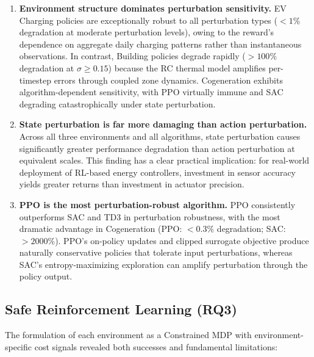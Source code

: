 \begin{enumerate}
    \item \textbf{Environment structure dominates perturbation sensitivity.} EV Charging policies are exceptionally robust to all perturbation types ($<1\%$ degradation at moderate perturbation levels), owing to the reward's dependence on aggregate daily charging patterns rather than instantaneous observations. In contrast, Building policies degrade rapidly ($>100\%$ degradation at $\sigma \geq 0.15$) because the RC thermal model amplifies per-timestep errors through coupled zone dynamics. Cogeneration exhibits algorithm-dependent sensitivity, with PPO virtually immune and SAC degrading catastrophically under state perturbation.

    \item \textbf{State perturbation is far more damaging than action perturbation.} Across all three environments and all algorithms, state perturbation causes significantly greater performance degradation than action perturbation at equivalent scales. This finding has a clear practical implication: for real-world deployment of RL-based energy controllers, investment in sensor accuracy yields greater returns than investment in actuator precision.

    \item \textbf{PPO is the most perturbation-robust algorithm.} PPO consistently outperforms SAC and TD3 in perturbation robustness, with the most dramatic advantage in Cogeneration (PPO: $<0.3\%$ degradation; SAC: $>2000\%$). PPO's on-policy updates and clipped surrogate objective produce naturally conservative policies that tolerate input perturbations, whereas SAC's entropy-maximizing exploration can amplify perturbation through the policy output.
\end{enumerate}

\subsection{Safe Reinforcement Learning (RQ3)}

The formulation of each environment as a Constrained MDP with environment-specific cost signals revealed both successes and fundamental limitations:

